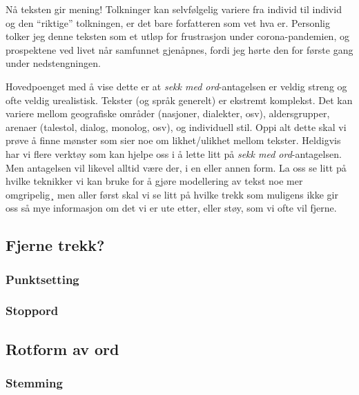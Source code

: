 \documentclass[
]{article}
\begin{document}
Nå teksten gir mening! Tolkninger kan selvfølgelig variere fra individ
til individ og den ``riktige'' tolkningen, er det bare forfatteren som
vet hva er. Personlig tolker jeg denne teksten som et utløp for
frustrasjon under corona-pandemien, og prospektene ved livet når
samfunnet gjenåpnes, fordi jeg hørte den for første gang under
nedstengningen.

Hovedpoenget med å vise dette er at \emph{sekk med ord}-antagelsen er
veldig streng og ofte veldig urealistisk. Tekster (og språk generelt) er
ekstremt komplekst. Det kan variere mellom geografiske områder
(nasjoner, dialekter, osv), aldersgrupper, arenaer (talestol, dialog,
monolog, osv), og individuell stil. Oppi alt dette skal vi prøve å finne
mønster som sier noe om likhet/ulikhet mellom tekster. Heldigvis har vi
flere verktøy som kan hjelpe oss i å lette litt på \emph{sekk med
ord}-antagelsen. Men antagelsen vil likevel alltid være der, i en eller
annen form. La oss se litt på hvilke teknikker vi kan bruke for å gjøre
modellering av tekst noe mer omgripelig¸ men aller først skal vi se litt
på hvilke trekk som muligens ikke gir oss så mye informasjon om det vi
er ute etter, eller støy, som vi ofte vil fjerne.

\hypertarget{fjerne-trekk}{%
\subsection{Fjerne trekk?}\label{fjerne-trekk}}

\hypertarget{punktsetting}{%
\subsubsection{Punktsetting}\label{punktsetting}}

\hypertarget{stoppord}{%
\subsubsection{Stoppord}\label{stoppord}}

\hypertarget{rotform-av-ord}{%
\subsection{Rotform av ord}\label{rotform-av-ord}}

\hypertarget{stemming}{%
\subsubsection{Stemming}\label{stemming}}
\end{document}
